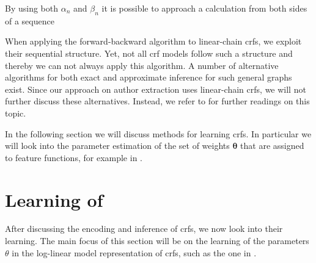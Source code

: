 \bigskip

By using both $\alpha_n$ and $\beta_n$ it is possible to approach a calculation from both sides of a sequence


\bigskip

When applying the forward-backward algorithm to \glspl{linear-chain crf}, we exploit their sequential structure.
Yet, not all \gls{crf} models follow such a structure and thereby we can not always apply this algorithm.
A number of alternative algorithms for both exact and approximate inference for such general graphs exist.
Since our approach on author extraction uses \glspl{linear-chain crf}, we will not further discuss these alternatives.
Instead, we refer to \citet{koller2009probabilistic} for further readings on this topic.

\bigskip

In the following section we will discuss methods for learning \glspl{crf}.
In particular we will look into the parameter estimation of the set of weights $\bm{\theta}$ that are assigned to \glspl{feature function}, for example in .

\section{Learning of }\label{sec:learning-crfs}

After discussing the encoding and inference of \glspl{crf}, we now look into their learning.
The main focus of this section will be on the learning of the parameters $\theta$ in the \gls{log-linear model} representation of \glspl{crf}, such as the one in .

\bigskip

